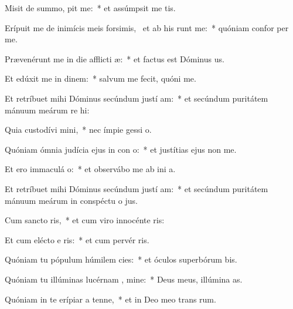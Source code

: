 \item Misit de summo,  pit me:~* et assúmpsit me   tis.
\item Erípuit me de inimícis meis forsimis,~\pscross{} et ab his  runt me:~* quóniam confor  per me.
\item Prævenérunt me in die afflicti æ:~* et factus est Dóminus  us.
\item Et edúxit me in dinem:~* salvum me fecit, quóni  me.
\item Et retríbuet mihi Dóminus secúndum justí am:~* et secúndum puritátem mánuum meárum re hi:
\item Quia custodívi  mini,~* nec ímpie gessi   o.
\item Quóniam ómnia judícia ejus in con o:~* et justítias ejus non   me.
\item Et ero immaculá  o:~* et observábo me ab ini a.
\item Et retríbuet mihi Dóminus secúndum justí am:~* et secúndum puritátem mánuum meárum in conspéctu o jus.
\item Cum sancto  ris,~* et cum viro innocénte  ris:
\item Et cum elécto e ris:~* et cum pervér ris.
\item Quóniam tu pópulum húmilem  cies:~* et óculos superbórum bis.
\item Quóniam tu illúminas lucérnam , mine:~* Deus meus, illúmina  as.
\item Quóniam in te erípiar a tenne,~* et in Deo meo trans rum.

